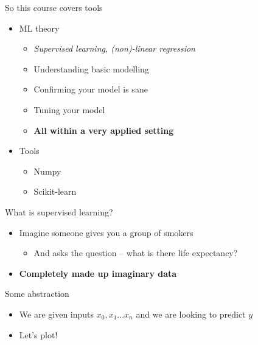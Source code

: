 \documentclass[obeyspaces,aspectratio=43]{beamer}
\providecommand{\tightlist}{%
  \setlength{\itemsep}{0pt}\setlength{\parskip}{0pt}}
\begin{document}
\begin{frame}{So this course covers tools}

\begin{itemize}
\tightlist
\item
  ML theory

  \begin{itemize}
  \tightlist
  \item
    \emph{Supervised learning, (non)-linear regression}
  \item
    Understanding basic modelling
  \item
    Confirming your model is sane
  \item
    Tuning your model
  \item
    \textbf{All within a very applied setting}
  \end{itemize}
\item
  Tools

  \begin{itemize}
  \tightlist
  \item
    Numpy
  \item
    Scikit-learn
  \end{itemize}
\end{itemize}

\end{frame}

\begin{frame}{What is supervised learning?}

\begin{itemize}
\tightlist
\item
  Imagine someone gives you a group of smokers

  \begin{itemize}
  \tightlist
  \item
    And asks the question -- what is there life expectancy?
  \end{itemize}
\item
  \textbf{Completely made up imaginary data}
\end{itemize}

\end{frame}

\begin{frame}{Some abstraction}

\begin{itemize}
\tightlist
\item
  We are given inputs \(x_0, x_1...x_n\) and we are looking to predict
  \(y\)
\item
  Let's plot!
\end{itemize}

\end{frame}
\end{document}
